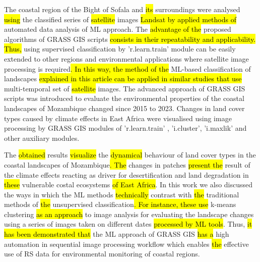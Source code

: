 \documentclass[coasts,article,submit,pdftex,moreauthors]{Definitions/mdpi}
\begin{document}
The coastal region of the Bight of Sofala and \hl{its }surroundings were analysed \hl{using} the classified series of \hl{satellite }images \hl{Landsat by applied methods of }automated data analysis of ML approach. The \hl{advantage of the }proposed algorithms of GRASS GIS scripts \hl{consists in their repeatability and applicability. Thus, }using supervised classification by 'r.learn.train' module can be easily extended to other regions and environmental applications where satellite image processing is required\hl{. In this way, the method of the }ML-based classification of landscapes \hl{explained in this article can be applied in similar studies that use} multi-temporal set of \hl{satellite }images. The advanced approach of GRASS GIS scripts was introduced to evaluate the environmental properties of the coastal landscapes of Mozambique changed since 2015 to 2023. Changes in land cover types caused by climate effects in East Africa were visualised using image processing by GRASS GIS modules of 'r.learn.train' , 'i.cluster', 'i.maxlik' and other auxiliary modules. 

The \hl{obtained} results \hl{visualize} the \hl{dynamical }behaviour of land cover types in the coastal landscapes of Mozambique\hl{. The} changes in patches \hl{present the} result of the climate effects reacting as driver for desertification and land degradation in \hl{these }vulnerable costal ecosystems \hl{of East Africa}. In this work we also discussed the ways in which the ML methods \hl{technically }contrast with \hl{the }traditional methods of \hl{the }unsupervised classification\hl{. For instance, these use} k-means clustering \hl{as an approach} to image analysis\hl{ }for evaluating the landscape changes using a series of images taken on different dates \hl{processed by ML tools}. Thus, \hl{it has been demonstrated that }the ML approach of GRASS GIS\hl{ has a }high automation in sequential image processing workflow which enables \hl{the }effective use of RS data for environmental monitoring of coastal regions.





\end{document}
